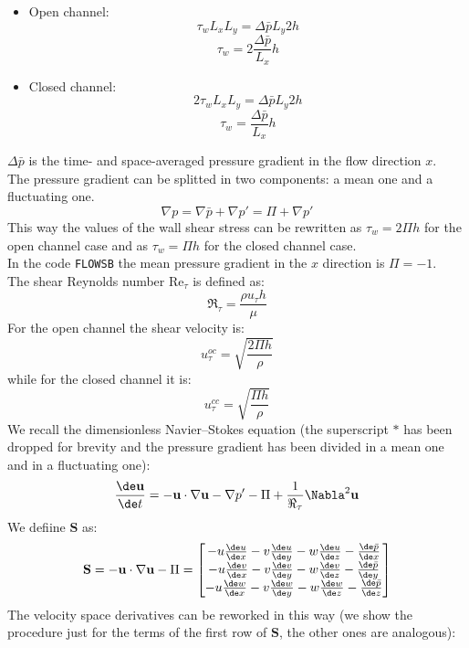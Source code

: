 \begin{itemize}
\item Open channel:
\[
\tau_wL_xL_y=\Delta\bar p L_y 2h
\]
\[
\tau_w=2\frac{\Delta \bar p}{L_x}h
\]
\item Closed channel:
\[
2\tau_wL_xL_y=\Delta\bar p L_y 2h
\]
\[
\tau_w=\frac{\Delta \bar p}{L_x}h
\]
\end{itemize}
$\Delta \bar p$ is the time- and space-averaged pressure gradient in the flow direction $x$.\\
The pressure gradient can be splitted in two components: a mean one and a fluctuating one.
\[
\nabla p=\nabla \bar p+\nabla p'=\Pi+\nabla p'
\]
This way the values of the wall shear stress can be rewritten as $\tau_w=2\Pi h$ for the open channel case and as $\tau_w=\Pi h$ for the closed channel case.\\
In the code \texttt{FLOWSB} the mean pressure gradient in the $x$ direction is $\Pi=-1$.\\
The shear Reynolds number Re$_\tau$ is defined as:
\begin{equation}
\Re_\tau=\frac{\rho u_\tau h}{\mu}
\end{equation}
For the open channel the shear velocity is:
\begin{equation}
u_\tau^{oc}=\sqrt{\frac{2\Pi h}{\rho}}
\end{equation}
while for the closed channel it is:
\begin{equation}
u_\tau^{cc}=\sqrt{\frac{\Pi h}{\rho}}
\end{equation}
We recall the dimensionless Navier--Stokes equation (the superscript $*$ has been dropped for brevity and the pressure gradient has been divided in a mean one and in a fluctuating one):
\[
\frac{\de \mathbf u}{\de t}=-\mathbf u\cdot \nabla \mathbf u-\nabla p'-\Pi+\frac{1}{\Re_\tau}\Nabla^2 \mathbf u
\]
We defiine $\mathbf S$ as:
\renewcommand\arraystretch{1.5}
\[
\mathbf S=-\mathbf u \cdot \nabla \mathbf u-\Pi=
\begin{bmatrix}
-u\frac{\de u}{\de x}-v\frac{\de u}{\de y}-w\frac{\de u}{\de z}-\frac{\de \bar p}{\de x}\\
-u\frac{\de v}{\de x}-v\frac{\de v}{\de y}-w\frac{\de v}{\de z}-\frac{\de \bar p}{\de y}\\
-u\frac{\de w}{\de x}-v\frac{\de w}{\de y}-w\frac{\de w}{\de z}-\frac{\de \bar p}{\de z}\\
\end{bmatrix}
\]
\renewcommand\arraystretch{1}
The velocity space derivatives can be reworked in this way (we show the procedure just for the terms of the first row of $\mathbf S$, the other ones are analogous):

